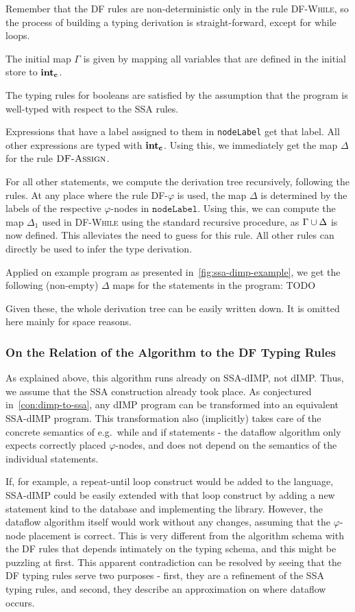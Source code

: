 Remember that the DF rules are non-deterministic only in the rule \textsc{DF-While},
so the process of building a typing derivation is straight-forward, except for while loops.

The initial map $\Gamma$ is given by mapping all variables that are defined in 
the initial store to $\textbf{int}_\textbf{c}$.

The typing rules for booleans are satisfied by the assumption that the program 
is well-typed with respect to the SSA rules.

Expressions that have a label assigned to them in \texttt{nodeLabel} get that label.
All other expressions are typed with $\textbf{int}_\textbf{c}$.
Using this, we immediately get the map $\Delta$ for the rule $\textsc{DF-Assign}$.

For all other statements, we compute the derivation tree recursively,
following the rules.
At any place where the rule \textsc{DF-$\varphi$} is used, the map $\Delta$ 
is determined by the labels of the respective $\varphi$-nodes in $\texttt{nodeLabel}$.
Using this, we can compute the map $\Delta_1$ used in \textsc{DF-While} using the
standard recursive procedure, as $\Gamma \cup \Delta$ is now defined.
This alleviates the need to guess for this rule.
All other rules can directly be used to infer the type derivation.

Applied on example program as presented in~\autoref{fig:ssa-dimp-example}, we 
get the following (non-empty) $\Delta$ maps for the statements in the program:
TODO

Given these, the whole derivation tree can be easily written down.
It is omitted here mainly for space reasons.

\subsubsection*{On the Relation of the Algorithm to the DF Typing Rules}
As explained above, this algorithm runs already on SSA-dIMP, not dIMP.
Thus, we assume that the SSA construction already took place.
As conjectured in~\autoref{con:dimp-to-ssa}, any dIMP program can be transformed into an equivalent
SSA-dIMP program.
This transformation also (implicitly) takes care of the concrete semantics of e.g.\ 
while and if statements - the dataflow algorithm only expects correctly placed $\varphi$-nodes,
and does not depend on the semantics of the individual statements.

If, for example, a repeat-until loop construct would be added to the language,
SSA-dIMP could be easily extended with that loop construct by adding a new statement 
kind to the database and implementing the library.
However, the dataflow algorithm itself would work without any changes, assuming that
the $\varphi$-node placement is correct.
This is very different from the algorithm schema with the DF rules that depends intimately on the 
typing schema, and this might be puzzling at first.
This apparent contradiction can be resolved by seeing that the DF typing 
rules serve two purposes - first, they are a refinement of the SSA typing rules,
and second, they describe an approximation on where dataflow occurs.

